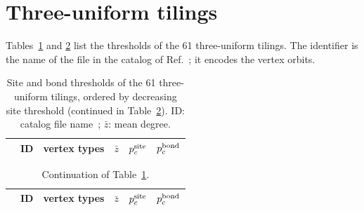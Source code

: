 \documentclass[pre,twocolumn,superscriptaddress,longbibliography,floatfix]{revtex4-2}
\newcommand{\ps}{p_c^{\rm site}}
\newcommand{\pb}{p_c^{\rm bond}}
\newcommand{\zb}{\bar z}
\begin{document}
\section{Three-uniform tilings}\label{app:tab}

Tables~\ref{tab:3uni} and \ref{tab:3unib} list the thresholds of the 61 three-uniform tilings. The identifier is the name of the file in the catalog of Ref.~\cite{TesCatalog}; it encodes the vertex orbits.

\begin{table}
\caption{Site and bond thresholds of the 61 three-uniform tilings, ordered by decreasing site threshold (continued in Table~\ref{tab:3unib}). ID: catalog file name~\cite{TesCatalog}; $\zb$: mean degree.}
\label{tab:3uni}
\footnotesize
\begin{ruledtabular}
\begin{tabular}{rllrll}
 & ID & vertex types & $\zb$ & $\ps$ & $\pb$\\
\hline

\end{tabular}
\end{ruledtabular}
\end{table}

\begin{table}
\caption{Continuation of Table~\ref{tab:3uni}.}
\label{tab:3unib}
\footnotesize
\begin{ruledtabular}
\begin{tabular}{rllrll}
 & ID & vertex types & $\zb$ & $\ps$ & $\pb$\\
\hline

\end{tabular}
\end{ruledtabular}
\end{table}

\clearpage

\end{document}
